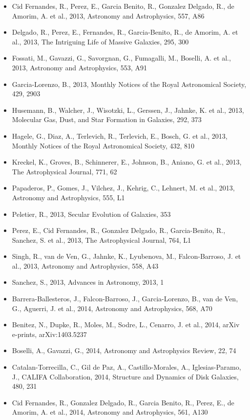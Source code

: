\documentclass{letter}
\begin{document}
\begin{enumerate}
\begin{itemize}
\item Cid Fernandes, R., Perez, E., Garcia Benito, R., Gonzalez Delgado, R., de Amorim, A. et al., 2013, Astronomy and Astrophysics, 557, A86
\item Delgado, R., Perez, E., Fernandes, R., Garcia-Benito, R., de Amorim, A. et al., 2013, The Intriguing Life of Massive Galaxies, 295, 300
\item Fossati, M., Gavazzi, G., Savorgnan, G., Fumagalli, M., Boselli, A. et al., 2013, Astronomy and Astrophysics, 553, A91
\item Garcia-Lorenzo, B., 2013, Monthly Notices of the Royal Astronomical Society, 429, 2903
\item Husemann, B., Walcher, J., Wisotzki, L., Gerssen, J., Jahnke, K. et al., 2013, Molecular Gas, Dust, and Star Formation in Galaxies, 292, 373
\item Hagele, G., Diaz, A., Terlevich, R., Terlevich, E., Bosch, G. et al., 2013, Monthly Notices of the Royal Astronomical Society, 432, 810
\item Kreckel, K., Groves, B., Schinnerer, E., Johnson, B., Aniano, G. et al., 2013, The Astrophysical Journal, 771, 62
\item Papaderos, P., Gomes, J., Vilchez, J., Kehrig, C., Lehnert, M. et al., 2013, Astronomy and Astrophysics, 555, L1
\item Peletier, R., 2013, Secular Evolution of Galaxies, 353
\item Perez, E., Cid Fernandes, R., Gonzalez Delgado, R., Garcia-Benito, R., Sanchez, S. et al., 2013, The Astrophysical Journal, 764, L1
\item Singh, R., van de Ven, G., Jahnke, K., Lyubenova, M., Falcon-Barroso, J. et al., 2013, Astronomy and Astrophysics, 558, A43
\item Sanchez, S., 2013, Advances in Astronomy, 2013, 1
\item Barrera-Ballesteros, J., Falcon-Barroso, J., Garcia-Lorenzo, B., van de Ven, G., Aguerri, J. et al., 2014, Astronomy and Astrophysics, 568, A70
\item Benitez, N., Dupke, R., Moles, M., Sodre, L., Cenarro, J. et al., 2014, arXiv e-prints, arXiv:1403.5237
\item Boselli, A., Gavazzi, G., 2014, Astronomy and Astrophysics Review, 22, 74
\item Catalan-Torrecilla, C., Gil de Paz, A., Castillo-Morales, A., Iglesias-Paramo, J., CALIFA Collaboration, 2014, Structure and Dynamics of Disk Galaxies, 480, 231
\item Cid Fernandes, R., Gonzalez Delgado, R., Garcia Benito, R., Perez, E., de Amorim, A. et al., 2014, Astronomy and Astrophysics, 561, A130

\end{itemize}
\end{enumerate}
\end{document}

